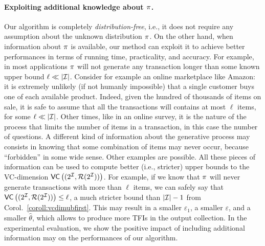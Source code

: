 \paragraph{Exploiting additional knowledge about $\pi$.} 
Our algorithm is completely \emph{distribution-free}, i.e., it does not require
any assumption about the unknown distribution $\pi$. On the other hand, when
information about $\pi$ is available, our method can exploit it to achieve
better performances in terms of running time, practicality, and accuracy. 
For example, in most applications $\pi$ will not generate any transaction
longer than some known upper bound $\ell\ll|{\cal I}|$. 
Consider for example an online
marketplace like Amazon: it is extremely unlikely (if not humanly impossible)
that a single customer buys one of each available product. Indeed, given the
hundred of thousands of items on sale, it is safe to assume that all the
transactions will contains at most $\ell$ items, for some $\ell\ll|{\cal I}|$. Other
times, like in an online survey, it is the nature of the process that limits the
number of items in a transaction, in this case the number of questions. A
different kind of information about the generative process may consists in
knowing that some combination of items may never occur, because ``forbidden'' in
some wide sense. Other examples are possible. All these pieces of information
can be used to compute better (i.e., stricter) upper bounds to the VC-dimension
$\mathsf{VC}\left((2^{\cal I},\mathcal{R}(2^{\cal I}))\right)$. For example, if we know that $\pi$ will never generate
transactions with more than $\ell$ items, we can safely say that
$\mathsf{VC}\left((2^{\cal I},\mathcal{R}(2^{\cal I}))\right)\le \ell$, a much stricter bound than $|{\cal I}|-1$ from
Corol.~\ref{coroll:vcdimubfirst}. This may result in a smaller $\varepsilon_1$, a smaller 
$\varepsilon$, and a smaller $\hat\theta$, which allows to produce
more TFIs in the output collection. In the experimental evaluation, we show the
positive impact of including additional information may on the performances of
our algorithm.

